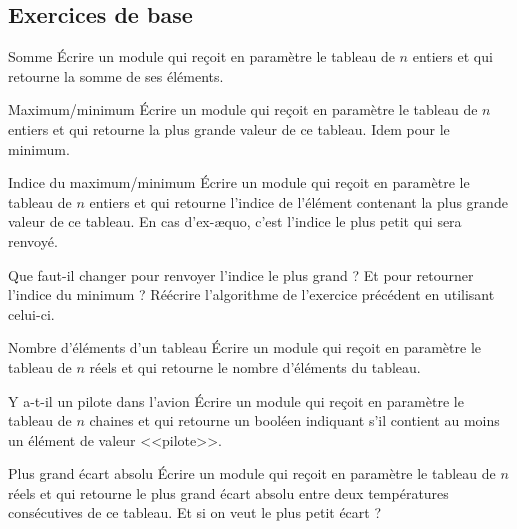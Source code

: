 \subsection{Exercices de base}

\begin{Exercice}{Somme}
	Écrire un module qui reçoit en paramètre le tableau
	 de $n$ entiers 
	et qui retourne la somme de ses éléments.
\end{Exercice}

\begin{Exercice}{Maximum/minimum}
	Écrire un module qui reçoit en paramètre le tableau
	 de $n$ entiers et qui
	retourne la plus grande valeur de ce tableau. Idem pour le minimum.
\end{Exercice}

\begin{Exercice}{Indice du maximum/minimum}
	\label{ex:indiceminmax}
	Écrire un module qui reçoit en paramètre le tableau
	 de $n$ entiers et qui
	retourne l’indice de l’élément contenant la plus grande valeur de ce
	tableau. 
	En cas d’ex-æquo, c’est l’indice le plus petit qui sera renvoyé.
	
	Que faut-il changer pour renvoyer l’indice le plus grand ?
	Et pour retourner l’indice du minimum ? 
	Réécrire l’algorithme de l’exercice précédent en utilisant celui-ci.
\end{Exercice}

\begin{Exercice}{Nombre d'éléments d'un tableau}
	Écrire un module qui reçoit en paramètre le tableau
	 de $n$ réels et qui
	retourne le nombre d’éléments du tableau.
\end{Exercice}

\begin{Exercice}{Y a-t-il un pilote dans l'avion}
	Écrire un module qui reçoit en paramètre le tableau
	 de $n$ chaines 
	et qui retourne un booléen 
	indiquant s'il contient au moins un élément de 
	valeur <<pilote>>. 
\end{Exercice}

\begin{Exercice}{Plus grand écart absolu}
	Écrire un module qui reçoit en paramètre le tableau
	 de $n$ réels et qui
	retourne le plus grand écart absolu entre deux températures 
	consécutives de ce tableau.
	Et si on veut le plus petit écart ?
\end{Exercice}

